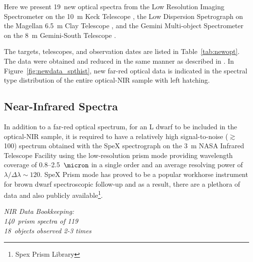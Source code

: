 \documentclass[12pt,preprint]{aastex}
\newcommand{\newopt}{19} %
\newcommand{\prismspectra}{140} %
\newcommand{\dupes}{18} %
\newcommand{\objects}{119} %
\begin{document}

\label{sec:obs_new_opt}

Here we present \newopt~new optical spectra from the Low Resolution Imaging Spectrometer on the 10~m Keck Telescope \citep[LRIS]{LRIS}, the Low Dispersion Spetrograph on the Magellan 6.5~m Clay Telescope \citep[LDSS-3]{LDSS2}, and the Gemini Multi-object Spectrometer on the 8~m Gemini-South Telescope \citep[GMOS]{GMOS}.

The targets, telescopes, and observation dates are listed in Table~\ref{tab:newopt}. 
The data were obtained and reduced in the same manner as described in \citet{Kirkpatrick10}. 
In Figure~\ref{fig:newdata_spthist}, new far-red optical data is indicated in the spectral type distribution of the entire optical-NIR sample with left hatching.

\subsection{Near-Infrared Spectra}

In addition to a far-red optical spectrum, for an L dwarf to be included in the optical-NIR sample, it is required to have a relatively high signal-to-noise ($\gtrsim$100) spectrum obtained with the SpeX spectrograph \citep{Spex} on the 3~m NASA Infrared Telescope Facility using the low-resolution prism mode providing wavelength coverage of 0.8--2.5~$\micron$ in a single order and an average resolving power of $\lambda/\Delta\lambda\sim120$.
SpeX Prism mode has proved to be a popular workhorse instrument for brown dwarf spectroscopic follow-up and as a result, there are a plethora of data and also publicly available\footnote{Spex Prism Library}. 

\label{sec:obs_new_nir}

\emph{NIR Data Bookkeeping: \\
\prismspectra~prism spectra of \objects \\
\dupes~objects observed 2-3 times}
\end{document}
